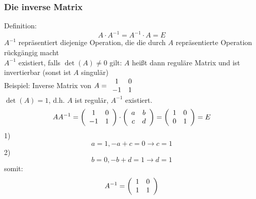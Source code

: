 \documentclass{article}
\begin{document}
\subsubsection{Die inverse Matrix}
Definition:
\begin{equation*}
    A\cdot A^{-1} = A^{-1}\cdot A = E
\end{equation*}
$A^{-1}$ repräsentiert diejenige Operation, die die durch $A$ repräsentierte Operation rückgängig macht\\
$A^{-1}$ existiert, falls $\det(A)\neq 0$ gilt: $A$ heißt dann reguläre Matrix und ist invertierbar (sonst ist $A$ singulär)\\
Beispiel: Inverse Matrix von $A=\begin{array}{c c}1&0\\-1&1\end{array}$\\
$\det(A)=1$, d.h. $A$ ist regulär, $A^{-1}$ existiert.
\begin{equation*}
    AA^{-1}=\left(\begin{array}{c c}1&0\\-1&1\end{array}\right)\cdot\left(\begin{array}{c c}a&b\\c&d\end{array}\right) = \left(\begin{array}{c c}1&0\\0&1\end{array}\right) = E
\end{equation*}
1)
\begin{equation*}
    a = 1, -a+c = 0 \rightarrow c=1
\end{equation*}
2)
\begin{equation*}
    b = 0, -b + d = 1 \rightarrow d=1
\end{equation*}
somit:
\begin{equation*}
    A^{-1} =\left(\begin{array}{c c}1&0\\1&1\end{array}\right)
\end{equation*}
\end{document}
